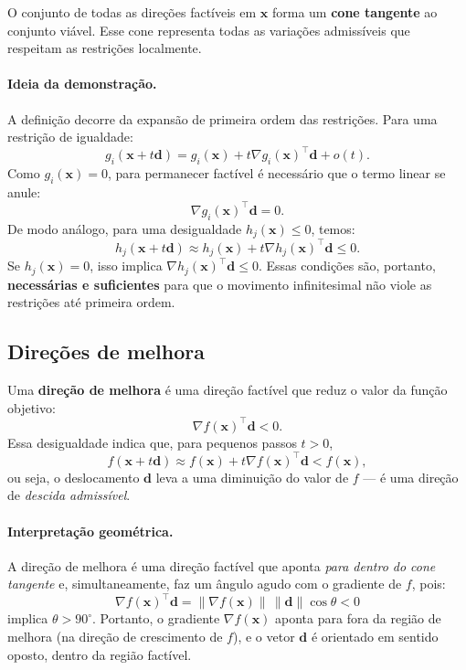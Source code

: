\documentclass[9pt,a4paper]{extarticle}
\begin{document}
O conjunto de todas as direções factíveis em $\bm{x}$ forma um \textbf{cone tangente} ao conjunto viável.  
Esse cone representa todas as variações admissíveis que respeitam as restrições localmente.

\paragraph{Ideia da demonstração.}
A definição decorre da expansão de primeira ordem das restrições.  
Para uma restrição de igualdade:
\[
g_i(\bm{x}+t\bm{d}) = g_i(\bm{x}) + t\nabla g_i(\bm{x})^\top \bm{d} + o(t).
\]
Como $g_i(\bm{x})=0$, para permanecer factível é necessário que o termo linear se anule:
\[
\nabla g_i(\bm{x})^\top \bm{d} = 0.
\]
De modo análogo, para uma desigualdade $h_j(\bm{x}) \le 0$, temos:
\[
h_j(\bm{x}+t\bm{d}) \approx h_j(\bm{x}) + t\nabla h_j(\bm{x})^\top \bm{d} \le 0.
\]
Se $h_j(\bm{x})=0$, isso implica $\nabla h_j(\bm{x})^\top \bm{d} \le 0$.  
Essas condições são, portanto, \textbf{necessárias e suficientes} para que o movimento infinitesimal não viole as restrições até primeira ordem.

\vspace{1em}

\subsection*{Direções de melhora}

Uma \textbf{direção de melhora} é uma direção factível que reduz o valor da função objetivo:
\[
\nabla f(\bm{x})^\top \bm{d} < 0.
\]
Essa desigualdade indica que, para pequenos passos $t>0$,
\[
f(\bm{x}+t\bm{d}) \approx f(\bm{x}) + t\nabla f(\bm{x})^\top \bm{d} < f(\bm{x}),
\]
ou seja, o deslocamento $\bm{d}$ leva a uma diminuição do valor de $f$ — é uma direção de \textit{descida admissível}.

\paragraph{Interpretação geométrica.}
A direção de melhora é uma direção factível que aponta \textit{para dentro do cone tangente} e, simultaneamente, faz um ângulo agudo com o gradiente de $f$, pois:
\[
\nabla f(\bm{x})^\top \bm{d} = \|\nabla f(\bm{x})\| \, \|\bm{d}\| \cos\theta < 0
\]
implica $\theta > 90^\circ$.  
Portanto, o gradiente $\nabla f(\bm{x})$ aponta para fora da região de melhora (na direção de crescimento de $f$), e o vetor $\bm{d}$ é orientado em sentido oposto, dentro da região factível.
\end{document}
